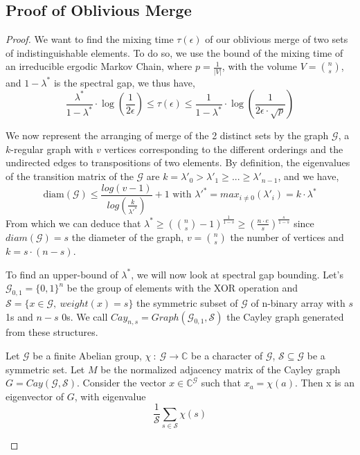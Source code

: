 \documentclass{llncs}
\begin{document}
\subsection{Proof of Oblivious Merge}\label{proof:OM}
\begin{proof}
We want to find the mixing time $\tau(\epsilon)$ of our oblivious merge of two sets of indistinguishable elements. To do so, we use the bound of the mixing time of an irreducible ergodic Markov Chain, where $p = \frac{1}{|V|}$, with the volume $V={n \choose s}$, and $1-\lambda^*$ is the spectral gap, we thus have,
$$\frac{\lambda^*}{1-\lambda^*} \cdot \log\left(\frac{1}{2 \epsilon} \right)\leq \tau(\epsilon) \leq \frac{1}{1-\lambda^*}\cdot \log \left( \frac{1}{2 \epsilon \cdot \sqrt{p}}\right) $$

We now represent the arranging of merge of the 2 distinct sets by the graph $\mathcal{G}$, a $k$-regular graph with $v$ vertices corresponding to the different orderings and the undirected edges to transpositions of two elements.
By definition, the eigenvalues of the transition matrix of the $\mathcal{G}$ are $k={\lambda'}_0 > {\lambda'}_1 \geq  ... \geq {\lambda'}_{n-1}$, and we have,
$$\text{diam}\left( \mathcal{G}\right) \leq \frac{log(v-1)}{log(\frac{k}{{\lambda'}^*})}+1 \text{ with } {\lambda'}^* = max_{i\neq0}({\lambda'}_i)= k \cdot \lambda^*$$
From which we can deduce that $ {\lambda}^* \geq \left ({n \choose s}-1 \right )^{\frac{1}{1-s}} \geq \left (\frac{n\cdot e}{s} \right )^{\frac{s}{1-s}} $ since $diam\left( \mathcal{G} \right)=s$ the diameter of the graph, $v= {n \choose s}$ the number of vertices and $k=s\cdot(n-s)$.

To find an upper-bound of $\lambda^*$, we will now look at spectral gap bounding.
Let's $\mathcal{G}_{0,1}=\{0,1\}^n$ be the group of elements with the XOR operation and $\mathcal{S}=\{x \in \mathcal{G},\ weight(x)=s\}$ the symmetric subset of $\mathcal{G}$ of n-binary array with $s$ 1s and $n-s$ 0s.
We call $Cay_{n,s}=Graph\left(  \mathcal{G}_{0,1}, \mathcal{S} \right) $ the Cayley graph generated from these structures.

\begin{lemma}
Let $\mathcal{G}$ be a finite Abelian group, $\chi\ :\  \mathcal{G} \rightarrow \mathbb{C}$ be a character of $\mathcal{G}$, $\mathcal{S} \subseteq \mathcal{G}$ be a symmetric set.
Let $M$ be the normalized adjacency matrix of the Cayley graph $G = Cay(\mathcal{G},\mathcal{S})$.
Consider the vector $x \in \mathbb{C}^\mathcal{G}$ such that $x_a = \chi(a)$. Then x is an eigenvector of $G$, with eigenvalue $$ \frac{1}{\mathcal{S}} \sum_{s\in \mathcal{S}} \chi\left(s\right)$$
\end{lemma}


\end{proof}
\end{document}
